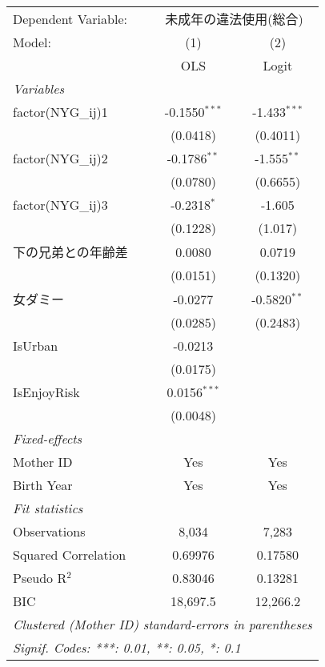 \documentclass{article}
\begin{document}
\begingroup
\centering
\begin{tabular}{lcc}
   \tabularnewline \midrule \midrule
   Dependent Variable: & \multicolumn{2}{c}{未成年の違法使用(総合)}\\
   Model:              & (1)             & (2)\\  
                       &  OLS            & Logit\\  
   \midrule
   \emph{Variables}\\
   factor(NYG\_ij)1    & -0.1550$^{***}$ & -1.433$^{***}$\\   
                       & (0.0418)        & (0.4011)\\   
   factor(NYG\_ij)2    & -0.1786$^{**}$  & -1.555$^{**}$\\   
                       & (0.0780)        & (0.6655)\\   
   factor(NYG\_ij)3    & -0.2318$^{*}$   & -1.605\\   
                       & (0.1228)        & (1.017)\\   
   下の兄弟との年齢差  & 0.0080          & 0.0719\\   
                       & (0.0151)        & (0.1320)\\   
   女ダミー            & -0.0277         & -0.5820$^{**}$\\   
                       & (0.0285)        & (0.2483)\\   
   IsUrban             & -0.0213         &   \\   
                       & (0.0175)        &   \\   
   IsEnjoyRisk         & 0.0156$^{***}$  &   \\   
                       & (0.0048)        &   \\   
   \midrule
   \emph{Fixed-effects}\\
   Mother ID           & Yes             & Yes\\  
   Birth Year          & Yes             & Yes\\  
   \midrule
   \emph{Fit statistics}\\
   Observations        & 8,034           & 7,283\\  
   Squared Correlation & 0.69976         & 0.17580\\  
   Pseudo R$^2$        & 0.83046         & 0.13281\\  
   BIC                 & 18,697.5        & 12,266.2\\  
   \midrule \midrule
   \multicolumn{3}{l}{\emph{Clustered (Mother ID) standard-errors in parentheses}}\\
   \multicolumn{3}{l}{\emph{Signif. Codes: ***: 0.01, **: 0.05, *: 0.1}}\\
\end{tabular}
\par\endgroup
\end{document}
